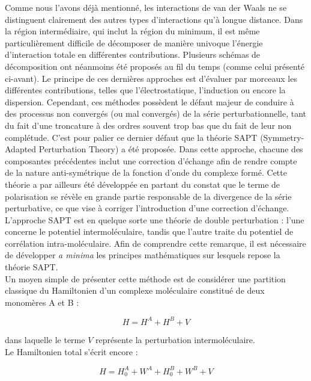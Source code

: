 	
	Comme nous l’avons déjà mentionné, les interactions de van der Waals ne se distinguent clairement des autres types d’interactions qu’à longue distance. Dans la région intermédiaire, qui inclut la région du minimum, il est même particulièrement difficile de décomposer de manière univoque l’énergie d'interaction totale en différentes contributions. Plusieurs schémas de décomposition ont néanmoins été proposés au fil du temps (comme celui présenté ci-avant). Le principe de ces dernières approches est d’évaluer par morceaux les différentes contributions, telles que l’électrostatique, l’induction ou encore la dispersion. Cependant, ces méthodes possèdent le défaut majeur de conduire à des processus non convergés (ou mal convergés) de la série perturbationnelle, tant du fait d'une troncature à des ordres souvent trop bas que du fait de leur non complétude. C’est pour palier ce dernier défaut que la théorie SAPT (Symmetry-Adapted Perturbation Theory) a été proposée. Dans cette approche, chacune des composantes précédentes inclut une correction d’échange afin de rendre compte de la nature anti-symétrique de la fonction d’onde du complexe formé. Cette théorie a par ailleurs été développée en partant du constat que le terme de polarisation se révèle en grande partie responsable de la divergence de la série perturbative, ce que vise à corriger l'introduction d'une correction d'échange. \\ 
		
	L’approche SAPT est en quelque sorte une théorie de double perturbation : l’une concerne le potentiel intermoléculaire, tandis que l’autre traite du potentiel de corrélation intra-moléculaire. Afin de comprendre cette remarque, il est nécessaire de développer \textit{a minima} les principes mathématiques sur lesquels repose la théorie SAPT.\\
	
	Un moyen simple de présenter cette méthode est de considérer une partition classique du Hamiltonien d'un complexe moléculaire constitué de deux monomères A et B :
	
	\begin{equation}
	H = H^{A} + H^{B} + V
	\end{equation}
	
	\noindent dans laquelle le terme $V$ représente la perturbation intermoléculaire.\\
	
	Le Hamiltonien total s'écrit encore :
	
	\begin{equation}
	H = H_{0}^{A} + W^{A} + H_{0}^{B} + W^{B} + V
	\end{equation}
	
